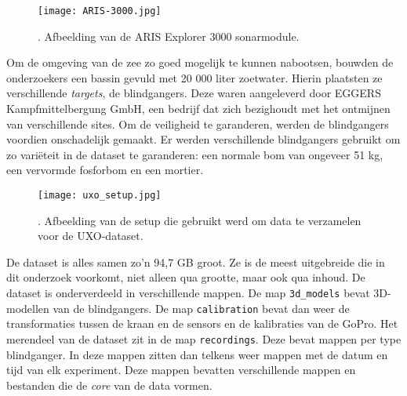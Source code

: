 \begin{figure}[H]
    \centering
    \texttt{[image: ARIS-3000.jpg]}
    \caption[Afbeelding van de ARIS Explorer 3000]{\label{fig:aris_3000}. Afbeelding van de ARIS Explorer 3000 sonarmodule. \autocite{soundmetrics.com}}
\end{figure}

Om de omgeving van de zee zo goed mogelijk te kunnen nabootsen, bouwden de onderzoekers een bassin gevuld met 20 000 liter zoetwater. Hierin plaatsten ze verschillende \emph{targets}, de \glspl{blindganger}. Deze waren aangeleverd door EGGERS Kampfmittelbergung GmbH, een bedrijf dat zich bezighoudt met het ontmijnen van verschillende sites. Om de veiligheid te garanderen, werden de \glspl{blindganger} voordien onschadelijk gemaakt. Er werden verschillende \glspl{blindganger} gebruikt om zo variëteit in de dataset te garanderen: een normale bom van ongeveer 51 kg, een vervormde fosforbom en een mortier. \autocite{Dahn_2024}

\begin{figure}[H]
    \centering
    \texttt{[image: uxo\_setup.jpg]}
    \caption[Setup waarmee de UXO-dataset gemaakt is]{\label{fig:uxo_setup}. Afbeelding van de setup die gebruikt werd om data te verzamelen voor de UXO-dataset. \autocite{Dahn_2024_UXO}}
\end{figure}

De dataset is alles samen zo'n 94,7 GB groot. Ze is de meest uitgebreide die in dit onderzoek voorkomt, niet alleen qua grootte, maar ook qua inhoud. De dataset is onderverdeeld in verschillende mappen. De map \texttt{3d\_models} bevat 3D-modellen van de \glspl{blindganger}. De map \texttt{calibration} bevat dan weer de transformaties tussen de kraan en de sensors en de kalibraties van de GoPro. Het merendeel van de dataset zit in de map \texttt{recordings}. Deze bevat mappen per type \gls{blindganger}. In deze mappen zitten dan telkens weer mappen met de datum en tijd van elk experiment. Deze mappen bevatten verschillende mappen en bestanden die de \emph{core} van de data vormen. \autocite{Dahn_2024_UXO}

\clearpage

